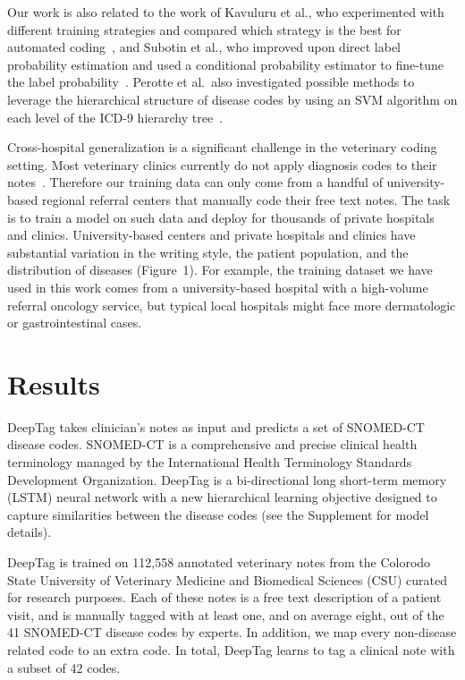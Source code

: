 \documentclass{article}[11pt,oneside]
\begin{document}
Our work is also related to the work of Kavuluru et al., who experimented with different training strategies and compared which strategy is the best for automated coding~\cite{kavuluru2015empirical}, and Subotin et al., who improved upon direct label probability estimation and used a conditional probability estimator to fine-tune the label probability~\cite{subotin2016method}. Perotte et al.~also investigated possible methods to leverage the hierarchical structure of disease codes by using an SVM algorithm on each level of the ICD-9 hierarchy tree~\cite{perotte2013diagnosis}.

Cross-hospital generalization is a significant challenge in the veterinary coding setting. Most veterinary clinics currently do not apply diagnosis codes to their notes~\cite{o2014approaches}. Therefore our training data can only come from a handful of university-based regional referral centers that manually code their free text notes. The task is to train a model on such data and deploy for thousands of private hospitals and clinics. University-based centers and private hospitals and clinics have substantial variation in the writing style, the patient population, and the distribution of diseases (Figure~1). For example, the training dataset we have used in this work comes from a university-based hospital with a high-volume referral oncology service, but typical local hospitals might face more dermatologic or gastrointestinal cases.

\section*{Results}

DeepTag takes clinician's notes as input and predicts a set of SNOMED-CT disease codes. SNOMED-CT is a comprehensive and precise clinical health terminology managed by the International Health Terminology Standards Development Organization. DeepTag is a bi-directional long short-term memory (LSTM) neural network with a new hierarchical learning objective designed to
capture similarities between the disease codes (see the Supplement for model details). 

DeepTag is trained on 112,558 annotated veterinary notes from the Colorodo State University of Veterinary Medicine and Biomedical Sciences (CSU) curated for research purposes. Each of these notes is a free text description of a patient visit, and is manually tagged with at least one, and on average eight, out of the 41 SNOMED-CT disease codes by experts. 
In addition, we map every non-disease related code to an extra  code. In total, DeepTag learns to tag a clinical note with a subset of 42 codes.
 
\end{document}
